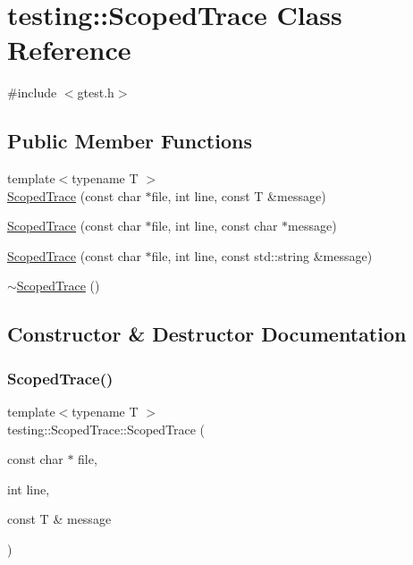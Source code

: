 \hypertarget{classtesting_1_1ScopedTrace}{}\section{testing\+::Scoped\+Trace Class Reference}
\label{classtesting_1_1ScopedTrace}


{\ttfamily \#include $<$gtest.\+h$>$}

\subsection*{Public Member Functions}
\begin{DoxyCompactItemize}
\item 
{\footnotesize template$<$typename T $>$ }\\\mbox{\hyperlink{classtesting_1_1ScopedTrace_a2da90b95d682d518cca472934d53c59c}{Scoped\+Trace}} (const char $\ast$file, int line, const T \&message)
\item 
\mbox{\hyperlink{classtesting_1_1ScopedTrace_accd2a06cc941ffd7d6fe109adfdb4f19}{Scoped\+Trace}} (const char $\ast$file, int line, const char $\ast$message)
\item 
\mbox{\hyperlink{classtesting_1_1ScopedTrace_a1f453a2aade0db6955a111a7cb329615}{Scoped\+Trace}} (const char $\ast$file, int line, const std\+::string \&message)
\item 
\mbox{\hyperlink{classtesting_1_1ScopedTrace_aa8320ec2679f205cf2c14f508ba35b4d}{$\sim$\+Scoped\+Trace}} ()
\end{DoxyCompactItemize}


\subsection{Constructor \& Destructor Documentation}
\mbox{\label{classtesting_1_1ScopedTrace_a2da90b95d682d518cca472934d53c59c}} 
\subsubsection{\texorpdfstring{ScopedTrace()}{ScopedTrace()}\hspace{0.1cm}{\footnotesize\ttfamily [1/3]}}
{\footnotesize\ttfamily template$<$typename T $>$ \\
testing\+::\+Scoped\+Trace\+::\+Scoped\+Trace (\begin{DoxyParamCaption}\item[{const char $\ast$}]{file,  }\item[{int}]{line,  }\item[{const T \&}]{message }\end{DoxyParamCaption})\hspace{0.3cm}{\ttfamily [inline]}}

